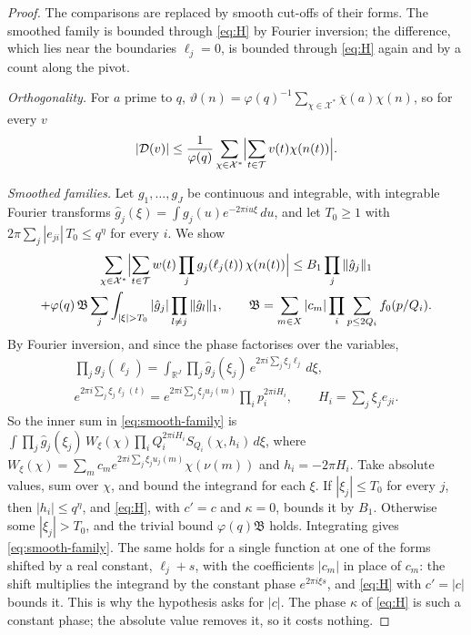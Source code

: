 \documentclass[11pt]{article}
\numberwithin{equation}{section}
\begin{document}
\begin{proof}
The comparisons are replaced by smooth cut-offs of their forms. The smoothed family is bounded through \eqref{eq:H} by
Fourier inversion; the difference, which lies near the boundaries $\ell_j = 0$, is bounded through \eqref{eq:H} again
and by a count along the pivot.

\emph{Orthogonality.} For $a$ prime to $q$, $\vartheta(n) = \varphi(q)^{-1} \sum_{\chi \in \mathcal X^*}
\overline\chi(a) \chi(n)$, so for every $v$
\begin{equation}\label{eq:orth}
  |\mathcal D(v)| \le \frac1{\varphi(q)} \sum_{\chi \in \mathcal X^*} \Bigl|\sum_{t \in \mathcal T} v(t)
  \chi(n(t))\Bigr|.
\end{equation}

\emph{Smoothed families.} Let $g_1, \dots, g_J$ be continuous and integrable, with integrable Fourier transforms $\hat
g_j(\xi) = \int g_j(u) e^{-2\pi i u \xi} \, du$, and let $T_0 \ge 1$ with $2\pi \sum_j |e_{ji}| \, T_0 \le q^{\eta}$ for
every $i$. We show
\begin{multline}\label{eq:smooth-family}
  \sum_{\chi \in \mathcal X^*} \Bigl|\sum_{t \in \mathcal T} w(t) \prod_j g_j(\ell_j(t)) \, \chi(n(t))\Bigr|
  \le B_1 \prod_j \|\hat g_j\|_1 \\
  + \varphi(q) \, \mathfrak B \sum_j \int_{|\xi| > T_0} |\hat g_j| \prod_{l \ne j} \|\hat g_l\|_1, \qquad
  \mathfrak B = \sum_{m \in X} |c_m| \prod_i \sum_{p \le 2Q_i} f_0(p/Q_i).
\end{multline}
By Fourier inversion, and since the phase factorises over the variables,
\begin{gather*}
  \prod_j g_j(\ell_j) = \int_{\mathbb R^J} \prod_j \hat g_j(\xi_j) \, e^{2\pi i \sum_j \xi_j \ell_j} \, d\xi, \\
  e^{2\pi i \sum_j \xi_j \ell_j(t)} = e^{2\pi i \sum_j \xi_j u_j(m)} \prod_i p_i^{2\pi i H_i}, \qquad
  H_i = \sum_j \xi_j e_{ji}.
\end{gather*}
So the inner sum in \eqref{eq:smooth-family} is $\int \prod_j \hat g_j(\xi_j) \, W_\xi(\chi) \prod_i Q_i^{2\pi i H_i}
S_{Q_i}(\chi, h_i) \, d\xi$, where $W_\xi(\chi) = \sum_m c_m e^{2\pi i \sum_j \xi_j u_j(m)} \chi(\nu(m))$ and $h_i
= -2\pi H_i$. Take absolute values, sum over $\chi$, and bound the integrand for each $\xi$. If $|\xi_j| \le T_0$ for
every $j$, then $|h_i| \le q^{\eta}$, and \eqref{eq:H}, with $c' = c$ and $\kappa = 0$, bounds it by $B_1$. Otherwise
some $|\xi_j| > T_0$, and the trivial bound $\varphi(q) \mathfrak B$ holds. Integrating gives \eqref{eq:smooth-family}.
The same holds for a single function at one of the forms shifted by a real constant, $\ell_j + s$, with the
coefficients $|c_m|$ in place of $c_m$: the shift multiplies the integrand by the constant phase $e^{2\pi i \xi s}$, and
\eqref{eq:H} with $c' = |c|$ bounds it. This is why the hypothesis asks for $|c|$. The phase $\kappa$ of \eqref{eq:H}
is such a constant phase; the absolute value removes it, so it costs nothing.


\end{proof}
\end{document}
